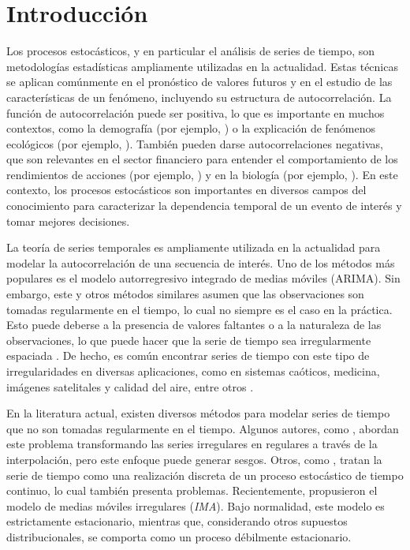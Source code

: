 \chapter{Introducci\'{o}n}


Los procesos estocásticos, y en particular el análisis de series de tiempo,
son metodologías estadísticas ampliamente utilizadas en la actualidad. 
Estas técnicas se aplican comúnmente en el pronóstico de valores futuros
y en el estudio de las características de un fenómeno, incluyendo su 
estructura de autocorrelación. La función de autocorrelación puede ser 
positiva, lo que es importante en muchos contextos, como la demografía 
(por ejemplo, \cite{novoseltseva2019spatial}) o la explicación de fenómenos 
ecológicos (por ejemplo, \cite{yang2019predictability}). También pueden darse 
autocorrelaciones negativas, que son relevantes en el sector 
financiero para entender el comportamiento de los rendimientos de 
acciones (por ejemplo, \cite{kuttu2017feedback}) y en la biología 
(por ejemplo, \cite{rindorf2020periodic}). En este contexto, los procesos 
estocásticos son importantes en diversos campos del conocimiento para 
caracterizar la dependencia temporal de un evento de interés y tomar 
mejores decisiones.


La teoría de series temporales es ampliamente utilizada en la actualidad
para modelar la autocorrelación de una secuencia de interés. Uno de 
los métodos más populares es el modelo autorregresivo integrado de 
medias móviles (ARIMA). Sin embargo, este y otros métodos similares 
asumen que las observaciones son tomadas regularmente en el tiempo, 
lo cual no siempre es el caso en la práctica. Esto puede deberse a la 
presencia de valores faltantes o a la naturaleza de las observaciones, 
lo que puede hacer que la serie de tiempo sea irregularmente espaciada 
\citep{elorrieta2019discrete}. De hecho, es común encontrar series de 
tiempo con este tipo de irregularidades en diversas aplicaciones, como
en sistemas caóticos, medicina, imágenes satelitales y calidad del 
aire, entre otros \citep{shamsan2020intrinsic, liu2019comparison, 
ghaderpour2020change, dilmaghani2007harmonic}.



En la literatura actual, existen diversos métodos para modelar series de 
tiempo que no son tomadas regularmente en el tiempo. Algunos autores, 
como \cite{adorf1995interpolation}, abordan este problema transformando 
las series irregulares en regulares a través de la interpolación, pero 
este enfoque puede generar sesgos. Otros, como \cite{robinson1977estimation},
tratan la serie de tiempo como una realización discreta de un proceso 
estocástico de tiempo continuo, lo cual también presenta problemas. 
Recientemente,  \cite{ojedaIMA} propusieron el modelo de medias móviles irregulares 
(\emph{IMA}). Bajo normalidad, este modelo es estrictamente estacionario, 
mientras que, considerando otros supuestos distribucionales, se comporta como un proceso débilmente estacionario. 
 
